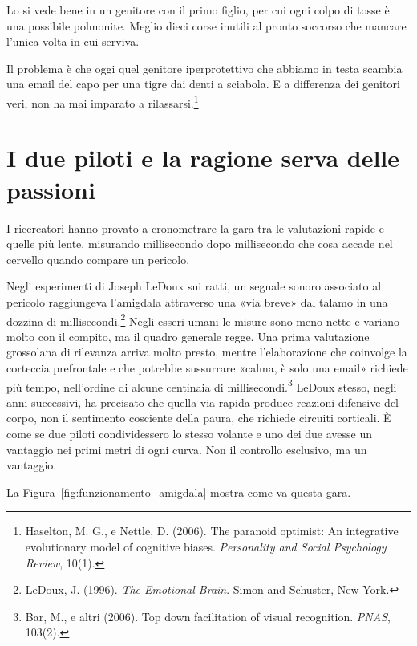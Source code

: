 Lo si vede bene in un genitore con il primo figlio, per cui ogni colpo di tosse è una possibile polmonite. Meglio dieci corse inutili al pronto soccorso che mancare l'unica volta in cui serviva.

Il problema è che oggi quel genitore iperprotettivo che abbiamo in testa scambia una email del capo per una tigre dai denti a sciabola. E a differenza dei genitori veri, non ha mai imparato a rilassarsi.\footnote{Haselton, M. G., e Nettle, D. (2006). The paranoid optimist: An integrative evolutionary model of cognitive biases. \textit{Personality and Social Psychology Review}, 10(1).}

\section{I due piloti e la ragione serva delle passioni}
\label{sec:p1c2-due-piloti}

I ricercatori hanno provato a cronometrare la gara tra le valutazioni rapide e quelle più lente, misurando millisecondo dopo millisecondo che cosa accade nel cervello quando compare un pericolo.

Negli esperimenti di Joseph LeDoux sui ratti, un segnale sonoro associato al pericolo raggiungeva l'amigdala attraverso una «via breve» dal talamo in una dozzina di millisecondi.\footnote{LeDoux, J. (1996). \textit{The Emotional Brain}. Simon and Schuster, New York.} Negli esseri umani le misure sono meno nette e variano molto con il compito, ma il quadro generale regge. Una prima valutazione grossolana di rilevanza arriva molto presto, mentre l'elaborazione che coinvolge la corteccia prefrontale e che potrebbe sussurrare «calma, è solo una email» richiede più tempo, nell'ordine di alcune centinaia di millisecondi.\footnote{Bar, M., e altri (2006). Top down facilitation of visual recognition. \textit{PNAS}, 103(2).} LeDoux stesso, negli anni successivi, ha precisato che quella via rapida produce reazioni difensive del corpo, non il sentimento cosciente della paura, che richiede circuiti corticali. È come se due piloti condividessero lo stesso volante e uno dei due avesse un vantaggio nei primi metri di ogni curva. Non il controllo esclusivo, ma un vantaggio.

La Figura~\ref{fig:funzionamento_amigdala} mostra come va questa gara.



